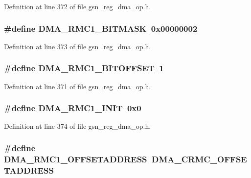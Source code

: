 Definition at line 372 of file gsn\_\-reg\_\-dma\_\-op.h.

\hypertarget{a00547_a06d57ad7f6a2245687d354c61a9762ff}{
\subsubsection[{DMA\_\-RMC1\_\-BITMASK}]{\setlength{\rightskip}{0pt plus 5cm}\#define DMA\_\-RMC1\_\-BITMASK~0x00000002}}
\label{a00547_a06d57ad7f6a2245687d354c61a9762ff}


Definition at line 373 of file gsn\_\-reg\_\-dma\_\-op.h.

\hypertarget{a00547_a4c27204c100375906d3c717e1db66986}{
\subsubsection[{DMA\_\-RMC1\_\-BITOFFSET}]{\setlength{\rightskip}{0pt plus 5cm}\#define DMA\_\-RMC1\_\-BITOFFSET~1}}
\label{a00547_a4c27204c100375906d3c717e1db66986}


Definition at line 371 of file gsn\_\-reg\_\-dma\_\-op.h.

\hypertarget{a00547_aded926e34290e2d81d63d57f791484e2}{
\subsubsection[{DMA\_\-RMC1\_\-INIT}]{\setlength{\rightskip}{0pt plus 5cm}\#define DMA\_\-RMC1\_\-INIT~0x0}}
\label{a00547_aded926e34290e2d81d63d57f791484e2}


Definition at line 374 of file gsn\_\-reg\_\-dma\_\-op.h.

\hypertarget{a00547_ab33eef90d93c3c0d0038af568d569928}{
\subsubsection[{DMA\_\-RMC1\_\-OFFSETADDRESS}]{\setlength{\rightskip}{0pt plus 5cm}\#define DMA\_\-RMC1\_\-OFFSETADDRESS~DMA\_\-CRMC\_\-OFFSETADDRESS}}
\label{a00547_ab33eef90d93c3c0d0038af568d569928}


